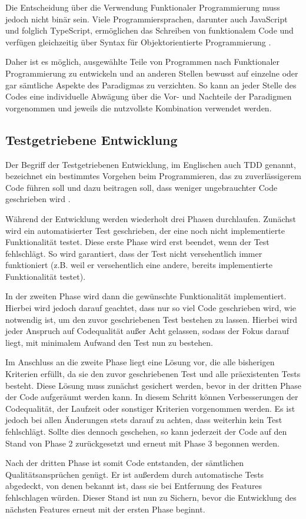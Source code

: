 Die Entscheidung über die Verwendung Funktionaler Programmierung muss jedoch nicht binär sein. Viele Programmiersprachen, darunter auch JavaScript und folglich TypeScript, ermöglichen das Schreiben von funktionalem Code und verfügen gleichzeitig über Syntax für Objektorientierte Programmierung \citep{benton2016js_functional}.

Daher ist es möglich, ausgewählte Teile von Programmen nach Funktionaler Programmierung zu entwickeln und an anderen Stellen bewusst auf einzelne oder gar sämtliche Aspekte des Paradigmas zu verzichten. So kann an jeder Stelle des Codes eine individuelle Abwägung über die Vor- und Nachteile der Paradigmen vorgenommen und jeweils die nutzvollste Kombination verwendet werden.

\subsection{Testgetriebene Entwicklung}
\label{state_of_the_art:tdd}
Der Begriff der Testgetriebenen Entwicklung, im Englischen auch \gls{TDD} genannt, bezeichnet ein bestimmtes Vorgehen beim Programmieren, das zu zuverlässigerem Code führen soll und dazu beitragen soll, dass weniger ungebrauchter Code geschrieben wird \cite{tdd_beck}.

Während der Entwicklung werden wiederholt drei Phasen durchlaufen. Zunächst wird ein automatisierter Test geschrieben, der eine noch nicht implementierte Funktionalität testet. Diese erste Phase wird erst beendet, wenn der Test fehlschlägt. So wird garantiert, dass der Test nicht versehentlich immer funktioniert (z.B. weil er versehentlich eine andere, bereits implementierte Funktionalität testet).

In der zweiten Phase wird dann die gewünschte Funktionalität implementiert. Hierbei wird jedoch darauf geachtet, dass nur so viel Code geschrieben wird, wie notwendig ist, um den zuvor geschriebenen Test bestehen zu lassen. Hierbei wird jeder Anspruch auf Codequalität außer Acht gelassen, sodass der Fokus darauf liegt, mit minimalem Aufwand den Test nun zu bestehen.

Im Anschluss an die zweite Phase liegt eine Lösung vor, die alle bisherigen Kriterien erfüllt, da sie den zuvor geschriebenen Test und alle präexistenten Tests besteht. Diese Lösung muss zunächst gesichert werden, bevor in der dritten Phase der Code aufgeräumt werden kann. In diesem Schritt können Verbesserungen der Codequalität, der Laufzeit oder sonstiger Kriterien vorgenommen werden. Es ist jedoch bei allen Änderungen stets darauf zu achten, dass weiterhin kein Test fehlschlägt. Sollte dies dennoch geschehen, so kann jederzeit der Code auf den Stand von Phase 2 zurückgesetzt und erneut mit Phase 3 begonnen werden.

Nach der dritten Phase ist somit Code entstanden, der sämtlichen Qualitätsansprüchen genügt. Er ist außerdem durch automatische Tests abgedeckt, von denen bekannt ist, dass sie bei Entfernung des Features fehlschlagen würden. Dieser Stand ist nun zu Sichern, bevor die Entwicklung des nächsten Features erneut mit der ersten Phase beginnt.
